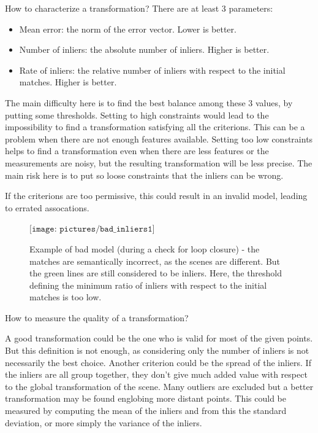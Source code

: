 How to characterize a transformation? There are at least 3 parameters:
\begin{itemize}
\item Mean error: the norm of the error vector. Lower is better.
\item Number of inliers: the absolute number of inliers. Higher is better.
\item Rate of inliers: the relative number of inliers with respect to the initial matches. Higher is better.
\end{itemize}

The main difficulty here is to find the best balance among these 3 values, by putting some thresholds. Setting to high constraints would lead to the impossibility to find a transformation satisfying all the criterions. This can be a problem when there are not enough features available. Setting too low constraints helps to find a transformation even when there are less features or the measurements are noisy, but the resulting transformation will be less precise. The main risk here is to put so loose constraints that the inliers can be wrong.

If the criterions are too permissive, this could result in an invalid model, leading to errated assocations. 

\begin{figure}[h!]
\centering$
\texttt{[image: pictures/bad\_inliers1]}$
\caption{Example of bad model (during a check for loop closure) - the matches are semantically incorrect, as the scenes are different. But the green lines are still considered to be inliers. Here, the threshold defining the minimum ratio of inliers with respect to the initial matches is too low.}
\end{figure}

\clearpage

How to measure the quality of a transformation?

A good transformation could be the one who is valid for most of the given points. But this definition is not enough, as considering only the number of inliers is not necessarily the best choice. Another criterion could be the spread of the inliers. If the inliers are all group together, they don't give much added value with respect to the global transformation of the scene. Many outliers are excluded but a better transformation may be found englobing more distant points. This could be measured by computing the mean of the inliers and from this the standard deviation, or more simply the variance of the inliers.


